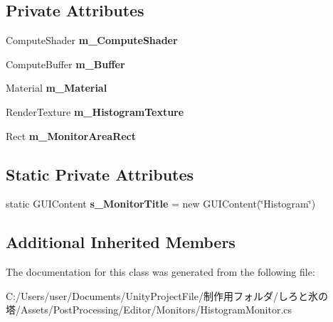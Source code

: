 \subsection*{Private Attributes}
\begin{DoxyCompactItemize}
\item 
\mbox{\label{class_unity_editor_1_1_post_processing_1_1_histogram_monitor_aabfefda9e2464db8c8704ec9a41f7eff}} 
Compute\+Shader {\bfseries m\+\_\+\+Compute\+Shader}
\item 
\mbox{\label{class_unity_editor_1_1_post_processing_1_1_histogram_monitor_a44f733570fde32cd0302ac3354aba674}} 
Compute\+Buffer {\bfseries m\+\_\+\+Buffer}
\item 
\mbox{\label{class_unity_editor_1_1_post_processing_1_1_histogram_monitor_a7c8680cefb79bea39c612cdea3a4948f}} 
Material {\bfseries m\+\_\+\+Material}
\item 
\mbox{\label{class_unity_editor_1_1_post_processing_1_1_histogram_monitor_a8b80c5b591b6272719fadb9207a2bc9e}} 
Render\+Texture {\bfseries m\+\_\+\+Histogram\+Texture}
\item 
\mbox{\label{class_unity_editor_1_1_post_processing_1_1_histogram_monitor_a8b3e53f73290cad55baf20f983d88c29}} 
Rect {\bfseries m\+\_\+\+Monitor\+Area\+Rect}
\end{DoxyCompactItemize}
\subsection*{Static Private Attributes}
\begin{DoxyCompactItemize}
\item 
\mbox{\label{class_unity_editor_1_1_post_processing_1_1_histogram_monitor_a9a710fa69b9e0c628dcc7e5d1c5ee14e}} 
static G\+U\+I\+Content {\bfseries s\+\_\+\+Monitor\+Title} = new G\+U\+I\+Content(\char`\"{}Histogram\char`\"{})
\end{DoxyCompactItemize}
\subsection*{Additional Inherited Members}


The documentation for this class was generated from the following file\+:\begin{DoxyCompactItemize}
\item 
C\+:/\+Users/user/\+Documents/\+Unity\+Project\+File/制作用フォルダ/しろと氷の塔/\+Assets/\+Post\+Processing/\+Editor/\+Monitors/Histogram\+Monitor.\+cs\end{DoxyCompactItemize}
